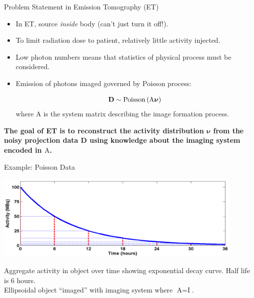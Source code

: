 \begin{frame}[c]{Problem Statement in Emission Tomography (ET)}

    \begin{itemize}
        \setlength\itemsep{0.3cm}
        \item In ET, source \emph{inside} body (can't just turn it off!).
        \item To limit radiation dose to patient,  relatively little activity injected.
        \item Low photon numbers means that statistics of physical process must be considered.
        \item Emission of photons imaged governed by Poisson process:

              \begin{equation*}
                  \mathbf{D} \sim \text{Poisson}\left( \text{A\boldmath$\nu$} \right)
              \end{equation*}
              where $\text{A}$ is the system matrix describing the image formation process.
    \end{itemize}
    \vspace{0.5cm}


    \textbf{The goal of ET is to reconstruct the activity distribution {$\mathbf{\nu}$} from the noisy projection data $\mathbf{D}$ using knowledge about the imaging system encoded in $\text{A}$.}
\end{frame}


\begin{frame}{Example: Poisson Data }
    \begin{centering}
        \includegraphics[width=0.9\textwidth]{images/decay}\\
    \end{centering}
    Aggregate activity in object over time showing exponential decay curve. Half life is $6$ hours. \\[0.25cm]
    Ellipsoidal object ``imaged'' with imaging system where $\text{A}=\text{I}$.
\end{frame}

